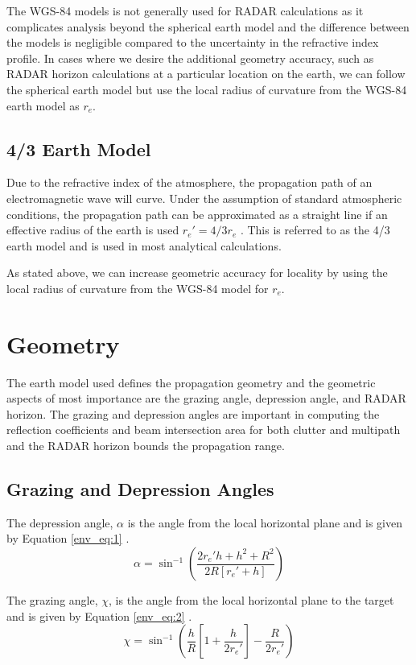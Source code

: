 The WGS-84 models is not generally used for RADAR calculations as it complicates analysis beyond the spherical earth model and the difference between the models is negligible compared to the uncertainty in the refractive index profile. In cases where we desire the additional geometry accuracy, such as RADAR horizon calculations at a particular location on the earth, we can follow the spherical earth model but use the local radius of curvature from the WGS-84 earth model as $r_e$.

\subsection{4/3 Earth Model}
Due to the refractive index of the atmosphere, the propagation path of an electromagnetic wave will curve. Under the assumption of standard atmospheric conditions, the propagation path can be approximated as a straight line if an effective radius of the earth is used $r_e' = 4/3 r_e$ \cite{blake_radar}\cite{nathanson_radar}. This is referred to as the 4/3 earth model and is used in most analytical calculations.

As stated above, we can increase geometric accuracy for locality by using the local radius of curvature from the WGS-84 model for $r_e$.

\section{Geometry}
The earth model used defines the propagation geometry and the geometric aspects of most importance are the grazing angle, depression angle, and RADAR horizon. The grazing and depression angles are important in computing the reflection coefficients and beam intersection area for both clutter and multipath and the RADAR horizon bounds the propagation range.

\subsection{Grazing and Depression Angles}
The depression angle, $\alpha$ is the angle from the local horizontal plane and is given by Equation \ref{env_eq:1} \cite{nathanson_radar}.
\begin{equation}
  \label{env_eq:1}
  \alpha = \sin^{-1}\left(\frac{2r_e'h + h^2 + R^2}{2R\left[r_e' + h \right]} \right)
  \end{equation}
  
The grazing angle, $\chi$, is the angle from the local horizontal plane to the target and is given by Equation \ref{env_eq:2} \cite{nathanson_radar}.
  \begin{equation}
  \label{env_eq:2}
  \chi = \sin^{-1}\left(\frac{h}{R}\left[1 + \frac{h}{2r_e'} \right] - \frac{R}{2r_e'} \right)
  \end{equation}
  
